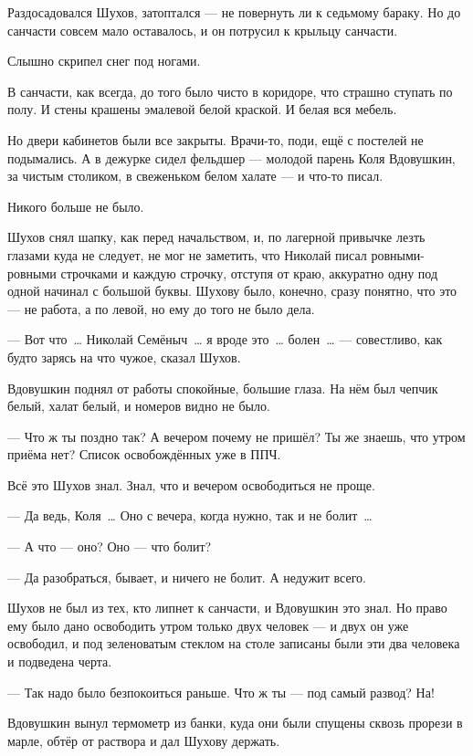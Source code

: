 Раздосадовался Шухов, затоптался --- не повернуть ли к седьмому бараку. Но до санчасти совсем 
мало оставалось, и он потрусил к крыльцу санчасти.

Слышно скрипел снег под ногами.

В санчасти, как всегда, до того было чисто в коридоре, что страшно ступать по полу. И стены 
крашены эмалевой белой краской. И белая вся мебель.

Но двери кабинетов были все закрыты. Врачи-то, поди, ещё с постелей не подымались. А в дежурке 
сидел фельдшер --- молодой парень Коля Вдовушкин, за чистым столиком, в свеженьком белом 
халате --- и что-то писал.

Никого больше не было.

Шухов снял шапку, как перед начальством, и, по лагерной привычке лезть глазами куда не 
следует, не мог не заметить, что Николай писал ровными-ровными строчками и каждую строчку, 
отступя от краю, аккуратно одну под одной начинал с большой буквы. Шухову было, конечно, 
сразу понятно, что это --- не работа, а по левой, но ему до того не было дела.

--- Вот что~\dots{} Николай Семёныч~\dots{} я вроде это~\dots{} болен~\dots{} --- совестливо, как будто зарясь 
на что чужое, сказал Шухов.

Вдовушкин поднял от работы спокойные, большие глаза. На нём был чепчик белый, халат белый, и 
номеров видно не было.

--- Что ж ты поздно так? А вечером почему не пришёл? Ты же знаешь, что утром приёма нет? Список 
освобождённых уже в ППЧ.

Всё это Шухов знал. Знал, что и вечером освободиться не проще.

--- Да ведь, Коля~\dots{} Оно с вечера, когда нужно, так и не болит~\dots{}

--- А что --- оно? Оно --- что болит?

--- Да разобраться, бывает, и ничего не болит. А недужит всего.

Шухов не был из тех, кто липнет к санчасти, и Вдовушкин это знал. Но право ему было дано 
освободить утром только двух человек --- и двух он уже освободил, и под зеленоватым стеклом на 
столе записаны были эти два человека и подведена черта.

--- Так надо было безпокоиться раньше. Что ж ты --- под самый развод? На!

Вдовушкин вынул термометр из банки, куда они были спущены сквозь прорези в марле, обтёр от 
раствора и дал Шухову держать.

